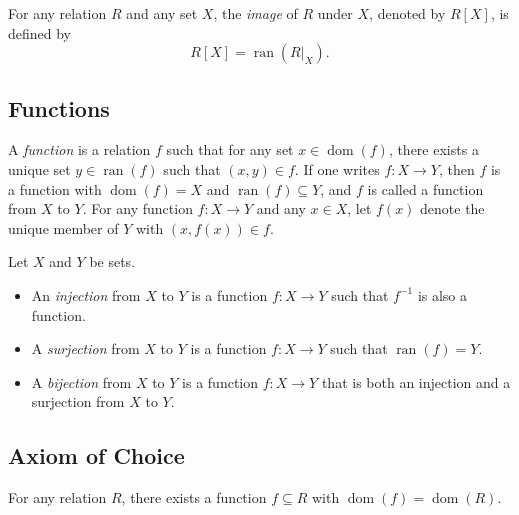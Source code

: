 \documentclass[11pt]{article}
\DeclareMathOperator{\dom}{dom}
\DeclareMathOperator{\ran}{ran}
\begin{document}
\begin{definition}
  For any relation $R$ and any set $X$, the \emph{image} of $R$ under $X$, denoted by $R[X]$, is defined by
  \begin{equation*}
    R[X] = \ran(R|_X).
  \end{equation*}
\end{definition}

\subsection{Functions}
\begin{definition}
  A \emph{function} is a relation $f$ such that for any set $x \in \dom(f)$, there exists a unique set $y \in \ran(f)$ such that $(x, y) \in f$.
  If one writes $f: X \to Y$, then $f$ is a function with $\dom(f) = X$ and $\ran(f) \subseteq Y$, and $f$ is called a function from $X$ to $Y$.
  For any function $f: X \to Y$ and any $x \in X$, let $f(x)$ denote the unique member of $Y$ with $(x, f(x)) \in f$.
\end{definition}

\begin{definition}
  Let $X$ and $Y$ be sets.
  \begin{itemize}
    \item An \emph{injection} from $X$ to $Y$ is a function $f: X \to Y$ such that $f^{-1}$ is also a function.
    \item A \emph{surjection} from $X$ to $Y$ is a function $f: X \to Y$ such that $\ran(f) = Y$.
    \item A \emph{bijection} from $X$ to $Y$ is a function $f: X \to Y$ that is both an injection and a surjection from $X$ to $Y$.
  \end{itemize}
\end{definition}

\subsection{Axiom of Choice}
\begin{axiom}[Choice]
  For any relation $R$, there exists a function $f \subseteq R$ with $\dom(f) = \dom(R)$.
\end{axiom}
\end{document}
